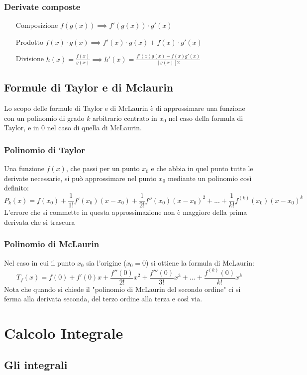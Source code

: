 \documentclass[12pt, a4paper, openany]{book}
\begin{document}
	\subsection*{Derivate composte}
	\begin{itemize}
		\item[Composizione] $f(g(x)) \implies f'(g(x)) \cdot g'(x)$
		\item[Prodotto] $f(x) \cdot g(x) \implies f'(x) \cdot g(x) + f(x) \cdot g'(x)$
  		\item[Divisione] $h(x)=\frac{f(x)}{g(x)} \implies h'(x) = \frac{f'(x)g(x) - f(x)g'(x)}{[g(x)]2}$
	\end{itemize}



	\section{Formule di Taylor e di Mclaurin}
	Lo scopo delle formule di Taylor e di McLaurin è di approssimare una funzione con un polinomio di grado $k$ arbitrario centrato in $x_0$ nel caso della formula di Taylor,
	e in 0 nel caso di quella di McLaurin.
	\subsection*{Polinomio di Taylor}
	Una funzione $f(x)$, che passi per un punto $x_0$ e che abbia in quel punto tutte le derivate necessarie,
	si può approssimare nel punto $x_0$ mediante un polinomio così definito:
	$$P_k(x)=f(x_0)+\frac{1}{1!}f'(x_0)(x-x_0) + \frac{1}{2!}f''(x_0)(x-x_0)^2 +... + \frac{1}{k!}f^{(k)}(x_0)(x-x_0)^k$$
	L'errore che si commette in questa approssimazione non è maggiore della prima derivata che si trascura
	\subsection*{Polinomio di McLaurin}
	Nel caso in cui il punto $x_0$ sia l'origine ($x_0=0$) si ottiene la formula di McLaurin:
	$$T_f(x) = f(0) + f'(0)x + \frac{f''(0)}{2!}x^2 + \frac{f'''(0)}{3!}x^3+...+ \frac{f^{(k)}(0)}{k!}x^k$$
	Nota che quando si chiede il "polinomio di McLaurin del secondo ordine" ci si ferma alla derivata seconda, del terzo ordine alla terza e così via.
	\chapter{Calcolo Integrale}
	\section{Gli integrali}
\end{document}
